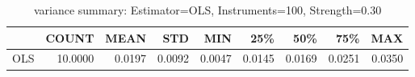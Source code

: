 \begin{table}[ht]
\centering
\caption{variance summary: Estimator=OLS, Instruments=100, Strength=0.30}
\begin{tabular}{lrrrrrrrr}
\toprule
 & COUNT & MEAN & STD & MIN & 25\% & 50\% & 75\% & MAX \\
\midrule
OLS & 10.0000 & 0.0197 & 0.0092 & 0.0047 & 0.0145 & 0.0169 & 0.0251 & 0.0350 \\
\bottomrule
\end{tabular}
\end{table}
